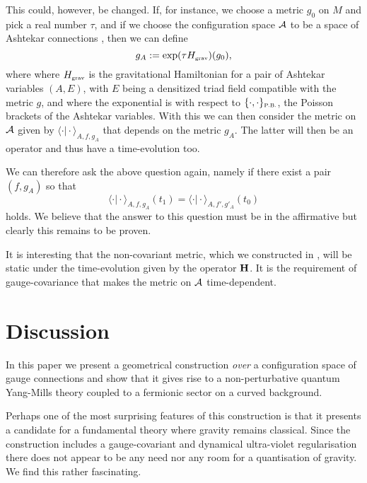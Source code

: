 \documentclass[letterpaper,11pt]{article}
\def\ca{{\cal A}}
\begin{document}
This could, however, be changed. If, for instance, we choose a metric $g_0$ on $M$ and pick a real number $\tau$, and if we choose the configuration space $\ca$ to be a space of Ashtekar connections \cite{Ashtekar:1986yd,Ashtekar:1987gu}, then we can define
\begin{equation}
g_A := \exp(\tau H_{\mbox{\tiny grav}}) (g_0),
\label{metric-time}
\end{equation}
where where $H_{\mbox{\tiny grav}}$ is the gravitational Hamiltonian for a pair of Ashtekar variables $(A,E)$, with $E$ being a densitized triad field compatible with the metric $g$, and where the exponential is with respect to $\{\cdot ,\cdot \}_{\mbox{\tiny P.B.}}$, the Poisson brackets of the Ashtekar variables. With this we can then consider the metric on $\ca$ given by
$\langle \cdot \vert \cdot\rangle_{A,f,g_A}$ that depends on the metric $g_A$. The latter will then be an operator and thus have a time-evolution too.

We can therefore ask the above question again, namely if there exist a pair $(f,g_A)$ so that
$$
\langle \cdot \vert \cdot\rangle_{A,f,g_A} (t_1) = \langle \cdot \vert \cdot\rangle_{A,f',g'_A} (t_0)
$$
holds.
We believe that the answer to this question must be in the affirmative but clearly this remains to be proven. 

It is interesting that the non-covariant metric, which we constructed in \cite{Aastrup:2017vrm}, will be static under the time-evolution given by the operator ${\bf H}$. It is the requirement of gauge-covariance that makes the metric on $\ca$ time-dependent.





\section{Discussion}
\label{secdiscussion}



 In this paper we present a geometrical construction {\it over} a configuration space of gauge connections and show that it gives rise to a non-perturbative quantum Yang-Mills theory coupled to a fermionic sector on a curved background.
 
Perhaps one of the most surprising features of this construction is that it presents a candidate for a fundamental theory where gravity remains classical. Since the construction includes a gauge-covariant and dynamical ultra-violet regularisation there does not appear to be any need nor any room for a quantisation of gravity. We find this rather fascinating.\\
 
\end{document}
